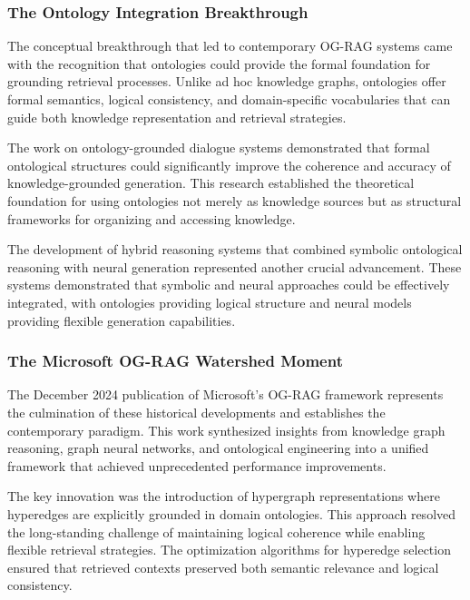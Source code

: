 \subsubsection{The Ontology Integration Breakthrough}

The conceptual breakthrough that led to contemporary OG-RAG systems came with the recognition that ontologies could provide the formal foundation for grounding retrieval processes. Unlike ad hoc knowledge graphs, ontologies offer formal semantics, logical consistency, and domain-specific vocabularies that can guide both knowledge representation and retrieval strategies.

The work on ontology-grounded dialogue systems \cite{he2022ontology} demonstrated that formal ontological structures could significantly improve the coherence and accuracy of knowledge-grounded generation. This research established the theoretical foundation for using ontologies not merely as knowledge sources but as structural frameworks for organizing and accessing knowledge.

The development of hybrid reasoning systems that combined symbolic ontological reasoning with neural generation \cite{bosselut2019comet} represented another crucial advancement. These systems demonstrated that symbolic and neural approaches could be effectively integrated, with ontologies providing logical structure and neural models providing flexible generation capabilities.

\subsubsection{The Microsoft OG-RAG Watershed Moment}

The December 2024 publication of Microsoft's OG-RAG framework \cite{chen2024og} represents the culmination of these historical developments and establishes the contemporary paradigm. This work synthesized insights from knowledge graph reasoning, graph neural networks, and ontological engineering into a unified framework that achieved unprecedented performance improvements.

The key innovation was the introduction of hypergraph representations where hyperedges are explicitly grounded in domain ontologies. This approach resolved the long-standing challenge of maintaining logical coherence while enabling flexible retrieval strategies. The optimization algorithms for hyperedge selection ensured that retrieved contexts preserved both semantic relevance and logical consistency.


